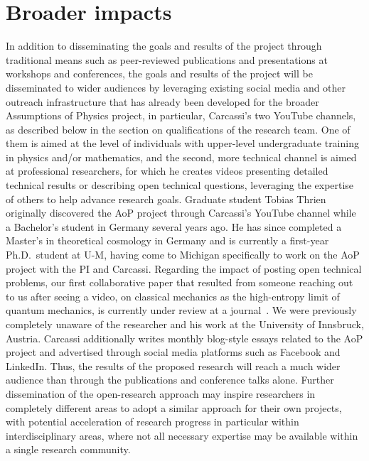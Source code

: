 


\section{Broader impacts}
In addition to disseminating the goals and results of the project through traditional means such as peer-reviewed publications and presentations at workshops and conferences, the goals and results of the project will be disseminated to wider audiences by leveraging existing social media and other outreach infrastructure that has already been developed for the broader Assumptions of Physics project, in particular, Carcassi's two YouTube channels, as described below in the section on qualifications of the research team.  One of them is aimed at the level of individuals with upper-level undergraduate training in physics and/or mathematics, and the second, more technical channel is aimed at professional researchers, for which he creates videos presenting detailed technical results or describing open technical questions, leveraging the expertise of others to help advance research goals.  Graduate student Tobias Thrien originally discovered the AoP project through Carcassi's YouTube channel while a Bachelor's student in Germany several years ago.  He has since completed a Master's in theoretical cosmology in Germany and is currently a first-year Ph.D.~student at U-M, having come to Michigan specifically to work on the AoP project with the PI and Carcassi.  Regarding the impact of posting open technical problems, our first collaborative paper that resulted from someone reaching out to us after seeing a video, on classical mechanics as the high-entropy limit of quantum mechanics, is currently under review at a journal~\cite{aop-classicallimit}.  We were previously completely unaware of the researcher and his work at the University of Innsbruck, Austria. Carcassi additionally writes monthly blog-style essays related to the AoP project and advertised through social media platforms such as Facebook and LinkedIn.  Thus, the results of the proposed research will reach a much wider audience than through the publications and conference talks alone.  Further dissemination of the open-research approach may inspire researchers in completely different areas to adopt a similar approach for their own projects, with potential acceleration of research progress in particular within interdisciplinary areas, where not all necessary expertise may be available within a single research community.  

